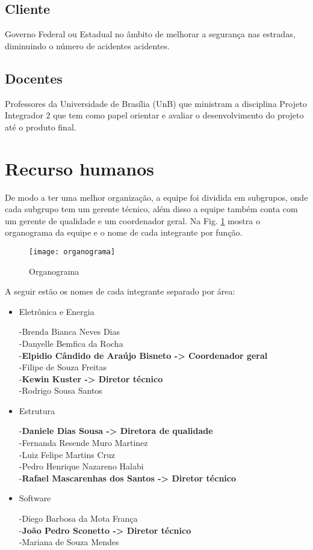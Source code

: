 \subsection {Cliente}

Governo Federal ou Estadual no âmbito de melhorar a segurança nas estradas, diminuindo o número de acidentes acidentes. 

\subsection {Docentes}

Professores da Universidade de Brasília (UnB) que ministram a disciplina Projeto Integrador 2 que tem como papel orientar e avaliar o desenvolvimento do projeto até o produto final.

\section{Recurso humanos}

 De modo a ter uma melhor organização, a equipe foi dividida em subgrupos, onde cada subgrupo tem um gerente técnico, além disso a equipe também conta com um gerente de qualidade e um coordenador geral. Na Fig. \ref{fig:organograma} mostra o organograma da equipe e o nome de cada integrante por função.
 
\begin{figure}[h]
\centering
\texttt{[image: organograma]}
\caption{Organograma}\label{fig:organograma}
\end{figure} 

A seguir estão os nomes de cada integrante separado por área:

\begin{itemize}
\item Eletrônica e Energia

-Brenda Bianca Neves Dias\\
-Danyelle Bemfica da Rocha\\
-\textbf{Elpidio Cândido de Araújo Bisneto -> Coordenador geral}\\
-Filipe de Souza Freitas\\
-\textbf{Kewin Kuster -> Diretor técnico}\\
-Rodrigo Sousa Santos

\item Estrutura

-\textbf{Daniele Dias Sousa -> Diretora de qualidade}\\
-Fernanda Resende Muro Martinez\\
-Luiz Felipe Martins Cruz\\
-Pedro Henrique Nazareno Halabi\\
-\textbf{Rafael Mascarenhas dos Santos -> Diretor técnico}

\item Software

-Diego Barbosa da Mota França\\
-\textbf{João Pedro Sconetto -> Diretor técnico}\\
-Mariana de Souza Mendes 


\end{itemize}

